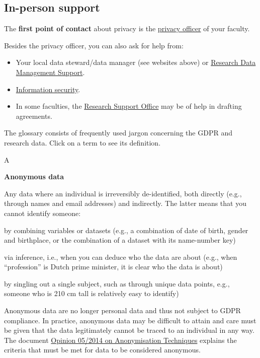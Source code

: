\documentclass[
]{book}
\providecommand{\tightlist}{%
  \setlength{\itemsep}{0pt}\setlength{\parskip}{0pt}}
\begin{document}
\hypertarget{support}{%
\subsection{In-person support}\label{support}}

The \textbf{first point of contact} about privacy is the \href{https://intranet.uu.nl/en/knowledgebase/privacyofficers}{privacy officer}
of your faculty.

Besides the privacy officer, you can also ask for help from:

\begin{itemize}
\tightlist
\item
  Your local data steward/data manager (see websites above) or
  \href{https://www.uu.nl/en/research/research-data-management/contact-us}{Research Data Management Support}.
\item
  \href{https://intranet.uu.nl/en/security/information-security-contact-who-are-we}{Information security}.
\item
  In some faculties, the \href{https://intranet.uu.nl/en/knowledgebase/research-support-offices}{Research Support Office}
  may be of help in drafting agreements.
\end{itemize}

The glossary consists of frequently used jargon concerning the GDPR and
research data. Click on a term to see its definition.

A

\textbf{Anonymous data}

Any data where an individual is irreversibly de-identified, both directly (e.g., through names and email addresses) and indirectly. The latter means that you cannot identify someone:

by combining variables or datasets (e.g., a combination of date of birth, gender and birthplace, or the combination of a dataset with its name-number key)

via inference, i.e., when you can deduce who the data are about (e.g., when ``profession'' is Dutch prime minister, it is clear who the data is about)

by singling out a single subject, such as through unique data points, e.g., someone who is 210 cm tall is relatively easy to identify)

Anonymous data are no longer personal data and thus not subject to GDPR
compliance. In practice, anonymous data may be difficult to attain and care must be given that the data legitimately cannot be traced to an individual in any way. The document \href{https://ec.europa.eu/justice/article-29/documentation/opinion-recommendation/files/2014/wp216_en.pdf}{Opinion 05/2014 on Anonymisation Techniques} explains the criteria that must be met for data to be considered anonymous.
\end{document}
